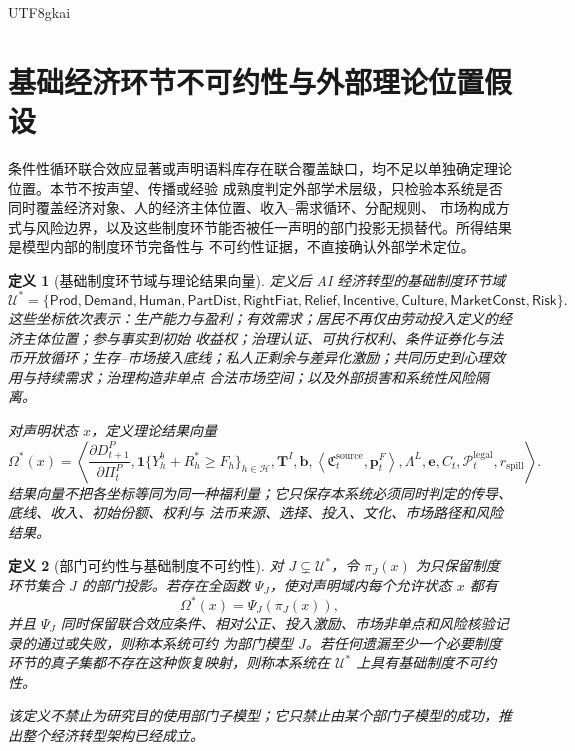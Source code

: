 \documentclass[12pt,a4paper,openany]{report}
\newtheorem{definition}{定义}[chapter]
\newcommand{\Tuple}[1]{\left\langle #1\right\rangle}
\begin{document}
\begin{CJK*}{UTF8}{gkai}
\section{基础经济环节不可约性与外部理论位置假设}
\label{sec:theoretical-position}

条件性循环联合效应显著或声明语料库存在联合覆盖缺口，均不足以单独确定理论位置。本节不按声望、传播或经验
成熟度判定外部学术层级，只检验本系统是否同时覆盖经济对象、人的经济主体位置、收入--需求循环、分配规则、
市场构成方式与风险边界，以及这些制度环节能否被任一声明的部门投影无损替代。所得结果是模型内部的制度环节完备性与
不可约性证据，不直接确认外部学术定位。

\begin{definition}[基础制度环节域与理论结果向量]
定义后 AI 经济转型的基础制度环节域
\[
  \mathcal U^*
  =\{
  \mathsf{Prod},
  \mathsf{Demand},
  \mathsf{Human},
  \mathsf{PartDist},
  \mathsf{RightFiat},
  \mathsf{Relief},
  \mathsf{Incentive},
  \mathsf{Culture},
  \mathsf{MarketConst},
  \mathsf{Risk}
  \}.
\]
这些坐标依次表示：生产能力与盈利；有效需求；居民不再仅由劳动投入定义的经济主体位置；参与事实到初始
收益权；治理认证、可执行权利、条件证券化与法币开放循环；生存--市场接入底线；私人正剩余与差异化激励；共同历史到心理效用与持续需求；治理构造非单点
合法市场空间；以及外部损害和系统性风险隔离。

对声明状态 \(x\)，定义理论结果向量
\[
  \Omega^*(x)
  =\Tuple{
  \frac{\partial D_{t+1}^{P}}{\partial\Pi_t^{P}},
  \mathbf 1\{Y_h^b+R_h^*\ge F_h\}_{h\in\mathcal H},
  \mathbf T^I,
  \mathbf b,
  \Tuple{\mathfrak C_t^{\mathrm{source}},\mathbf p_t^F},
  \Lambda^L,
  \mathbf e,
  C_t,
  \mathcal P_t^{\mathrm{legal}},
  r_{\mathrm{spill}}
  }.
\]
结果向量不把各坐标等同为同一种福利量；它只保存本系统必须同时判定的传导、底线、收入、初始份额、权利与
法币来源、选择、投入、文化、市场路径和风险结果。
\end{definition}

\begin{definition}[部门可约性与基础制度不可约性]
对 \(J\subsetneq\mathcal U^*\)，令 \(\pi_J(x)\) 为只保留制度环节集合 \(J\) 的部门投影。若存在全函数
\(\Psi_J\)，使对声明域内每个允许状态 \(x\) 都有
\[
  \Omega^*(x)=\Psi_J(\pi_J(x)),
\]
并且 \(\Psi_J\) 同时保留联合效应条件、相对公正、投入激励、市场非单点和风险核验记录的通过或失败，则称本系统可约
为部门模型 \(J\)。若任何遗漏至少一个必要制度环节的真子集都不存在这种恢复映射，则称本系统在
\(\mathcal U^*\) 上具有基础制度不可约性。

该定义不禁止为研究目的使用部门子模型；它只禁止由某个部门子模型的成功，推出整个经济转型架构已经成立。
\end{definition}


\end{CJK*}
\end{document}

